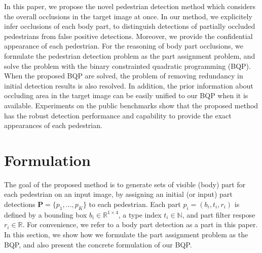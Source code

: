 \documentclass[runningheads]{llncs}
\begin{document}
In this paper, we propose the novel pedestrian detection method which considers the overall occlusions in the target image at once.
In our method, we explicitely infer occlusions of each body part, to distinguish detections of partially occluded pedestrians from false positive detections.
Moreover, we provide the confidential appearance of each pedestrian.
For the reasoning of body part occlusions, we formulate the pedestrian detection problem as the part assignment problem, and solve the problem with the binary constrainted quadratic programming (BQP).
When the proposed BQP are solved, the problem of removing redundancy in initial detection results is also resolved.
In addition, the prior information about occluding area in the target image can be easily unified to our BQP when it is available.
Experiments on the public benchmarks show that the proposed method has the robust detection performance and capability to provide the exact appearances of each pedestrian.


\section{Formulation}
\label{sec:formulation}
The goal of the proposed method is to generate sets of visible (body) part for each pedestrian on an input image, by assigning an initial (or input) part detections $\mathbf{P}=\{p_1,...,p_K\}$ to each pedestrian.
Each part $p_i = (b_i, t_i, r_i)$ is defined by a bounding box $b_i \in \mathbb{R}^{1\times4}$, a type index $t_i \in \mathbb{N}$, and part filter respose $r_i \in \mathbb{R}$. 
For convenience, we refer to a body part detection as a part in this paper.
In this section, we show how we formulate the part assignment problem as the BQP, and also present the concrete formulation of our BQP.

\end{document}
